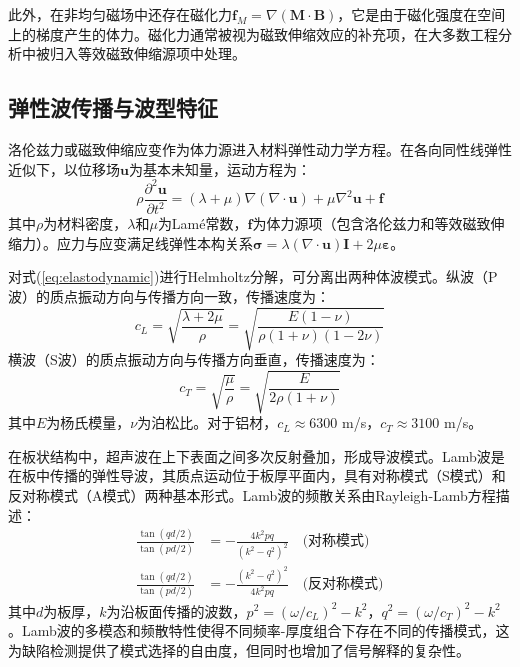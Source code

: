 此外，在非均匀磁场中还存在磁化力$\mathbf{f}_M = \nabla(\mathbf{M} \cdot \mathbf{B})$，它是由于磁化强度在空间上的梯度产生的体力。磁化力通常被视为磁致伸缩效应的补充项，在大多数工程分析中被归入等效磁致伸缩源项中处理\cite{ribichini2012modelling}。

\subsection{弹性波传播与波型特征}

洛伦兹力或磁致伸缩应变作为体力源进入材料弹性动力学方程。在各向同性线弹性近似下，以位移场$\mathbf{u}$为基本未知量，运动方程为\cite{rose2014ultrasonic}：
\begin{equation}
\rho \frac{\partial^2 \mathbf{u}}{\partial t^2} = (\lambda + \mu) \nabla(\nabla \cdot \mathbf{u}) + \mu \nabla^2 \mathbf{u} + \mathbf{f}
\label{eq:elastodynamic}
\end{equation}
其中$\rho$为材料密度，$\lambda$和$\mu$为Lam\'{e}常数，$\mathbf{f}$为体力源项（包含洛伦兹力和等效磁致伸缩力）。应力与应变满足线弹性本构关系$\bm{\sigma} = \lambda(\nabla\cdot\mathbf{u})\mathbf{I} + 2\mu\bm{\varepsilon}$。

对式(\ref{eq:elastodynamic})进行Helmholtz分解，可分离出两种体波模式。纵波（P波）的质点振动方向与传播方向一致，传播速度为：
\begin{equation}
c_L = \sqrt{\frac{\lambda + 2\mu}{\rho}} = \sqrt{\frac{E(1-\nu)}{\rho(1+\nu)(1-2\nu)}}
\label{eq:wave_speed_L}
\end{equation}
横波（S波）的质点振动方向与传播方向垂直，传播速度为：
\begin{equation}
c_T = \sqrt{\frac{\mu}{\rho}} = \sqrt{\frac{E}{2\rho(1+\nu)}}
\label{eq:wave_speed_T}
\end{equation}
其中$E$为杨氏模量，$\nu$为泊松比。对于铝材，$c_L \approx 6300$ m/s，$c_T \approx 3100$ m/s\cite{guo2024metal}。

在板状结构中，超声波在上下表面之间多次反射叠加，形成导波模式\cite{rose2014ultrasonic}。Lamb波是在板中传播的弹性导波，其质点运动位于板厚平面内，具有对称模式（S模式）和反对称模式（A模式）两种基本形式。Lamb波的频散关系由Rayleigh-Lamb方程描述：
\begin{align}
\frac{\tan(qd/2)}{\tan(pd/2)} &= -\frac{4k^2 pq}{(k^2 - q^2)^2} \quad \text{(对称模式)} \label{eq:lamb_sym} \\
\frac{\tan(qd/2)}{\tan(pd/2)} &= -\frac{(k^2 - q^2)^2}{4k^2 pq} \quad \text{(反对称模式)} \label{eq:lamb_antisym}
\end{align}
其中$d$为板厚，$k$为沿板面传播的波数，$p^2 = (\omega/c_L)^2 - k^2$，$q^2 = (\omega/c_T)^2 - k^2$。Lamb波的多模态和频散特性使得不同频率-厚度组合下存在不同的传播模式，这为缺陷检测提供了模式选择的自由度，但同时也增加了信号解释的复杂性。

